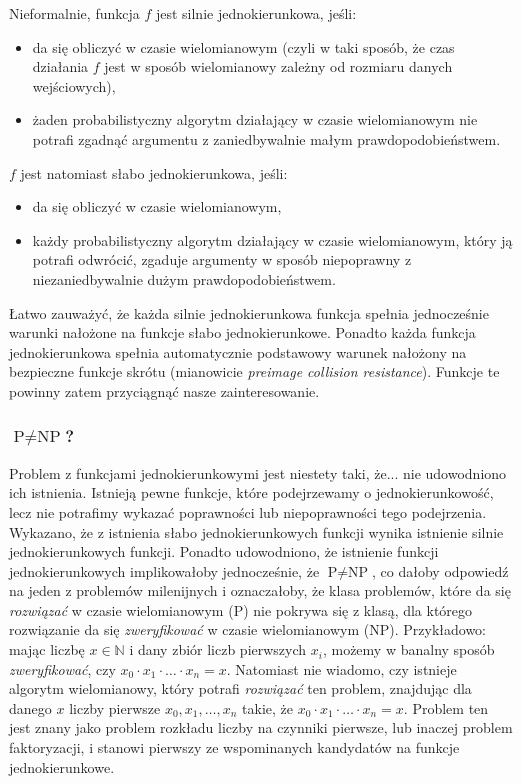 \documentclass[12pt,a4paper,twoside]{article}
\begin{document}
\noindent
Nieformalnie, funkcja $f$ jest silnie jednokierunkowa, jeśli:
\begin{itemize}
\item da się obliczyć w czasie wielomianowym (czyli w taki sposób, że czas
działania $f$ jest w sposób wielomianowy zależny od rozmiaru danych
wejściowych),
\item żaden probabilistyczny algorytm działający w czasie wielomianowym nie
potrafi zgadnąć argumentu z zaniedbywalnie małym prawdopodobieństwem.
\end{itemize}

\noindent
$f$ jest natomiast słabo jednokierunkowa, jeśli:
\begin{itemize}
\item da się obliczyć w czasie wielomianowym,
\item każdy probabilistyczny algorytm działający w czasie wielomianowym, który
ją potrafi odwrócić, zgaduje argumenty w sposób niepoprawny z niezaniedbywalnie
dużym prawdopodobieństwem.
\end{itemize}

Łatwo zauważyć, że każda silnie jednokierunkowa funkcja spełnia jednocześnie
warunki nałożone na funkcje słabo jednokierunkowe. Ponadto każda funkcja
jednokierunkowa spełnia automatycznie podstawowy warunek nałożony na bezpieczne
funkcje skrótu (mianowicie \textit{preimage collision resistance}). Funkcje te
powinny zatem przyciągnąć nasze zainteresowanie.

\subsubsection{$\textrm{P} \neq \textrm{NP}$?}
Problem z funkcjami jednokierunkowymi jest niestety taki, że... nie udowodniono
ich istnienia. Istnieją pewne funkcje, które podejrzewamy o jednokierunkowość,
lecz nie potrafimy wykazać poprawności lub niepoprawności tego podejrzenia.
Wykazano, że z istnienia słabo jednokierunkowych funkcji wynika istnienie
silnie jednokierunkowych funkcji. Ponadto udowodniono, że istnienie funkcji
jednokierunkowych implikowałoby jednocześnie, że $\textrm{P} \neq \textrm{NP}$,
co dałoby odpowiedź na jeden z problemów milenijnych i oznaczałoby, że klasa
problemów, które da się \emph{rozwiązać} w czasie wielomianowym ($\textrm{P}$)
nie pokrywa się z klasą, dla którego rozwiązanie da się \emph{zweryfikować} w
czasie wielomianowym ($\textrm{NP}$). Przykładowo: mając liczbę $x \in
\mathbb{N}$ i dany zbiór liczb pierwszych $x_i$, możemy w banalny sposób
\emph{zweryfikować}, czy $x_0 \cdot x_1 \cdot \ldots \cdot x_n = x$. Natomiast
nie wiadomo, czy istnieje algorytm wielomianowy, który potrafi \emph{rozwiązać}
ten problem, znajdując dla danego $x$ liczby pierwsze $x_0, x_1, \ldots, x_n$
takie, że $x_0 \cdot x_1 \cdot \ldots \cdot x_n = x$. Problem ten jest znany
jako problem rozkładu liczby na czynniki pierwsze, lub inaczej problem
faktoryzacji, i stanowi pierwszy ze wspominanych kandydatów na funkcje
jednokierunkowe.
\end{document}
